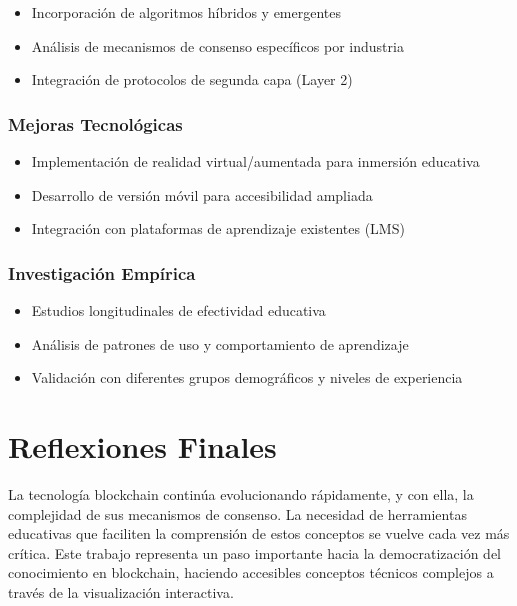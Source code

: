 \documentclass[spanish,12pt,letterpaper]{report}
\begin{document}
\begin{itemize}
    \item Incorporación de algoritmos híbridos y emergentes
    \item Análisis de mecanismos de consenso específicos por industria
    \item Integración de protocolos de segunda capa (Layer 2)
\end{itemize}

\subsubsection{Mejoras Tecnológicas}

\begin{itemize}
    \item Implementación de realidad virtual/aumentada para inmersión educativa
    \item Desarrollo de versión móvil para accesibilidad ampliada
    \item Integración con plataformas de aprendizaje existentes (LMS)
\end{itemize}

\subsubsection{Investigación Empírica}

\begin{itemize}
    \item Estudios longitudinales de efectividad educativa
    \item Análisis de patrones de uso y comportamiento de aprendizaje
    \item Validación con diferentes grupos demográficos y niveles de experiencia
\end{itemize}

\section{Reflexiones Finales}

La tecnología blockchain continúa evolucionando rápidamente, y con ella, la complejidad de sus mecanismos de consenso. La necesidad de herramientas educativas que faciliten la comprensión de estos conceptos se vuelve cada vez más crítica. Este trabajo representa un paso importante hacia la democratización del conocimiento en blockchain, haciendo accesibles conceptos técnicos complejos a través de la visualización interactiva.
\end{document}
